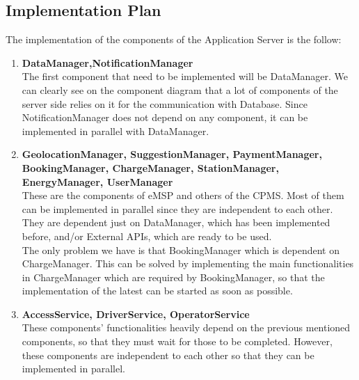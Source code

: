\documentclass[../main.tex]{subfiles}
\begin{document}
\subsection{Implementation Plan}
The implementation of the components of the Application Server is the follow: 
\begin{enumerate}
    \item \textbf{DataManager,NotificationManager} \\
    The first component that need to be implemented will be DataManager. We can clearly see on the component diagram that a lot of components of the server side relies on it for the communication with Database. Since NotificationManager does not depend on any component, it can be implemented in parallel with DataManager.
    
    \item \textbf{GeolocationManager, SuggestionManager, PaymentManager, BookingManager, ChargeManager, StationManager, EnergyManager, UserManager}\\
    These are the components of eMSP and others of the CPMS. Most of them can be implemented in parallel since they are independent to each other. They are dependent just on DataManager, which has been implemented before, and/or External APIs, which are ready to be used. \\
    The only problem we have is that BookingManager which is dependent on ChargeManager. This can be solved by implementing the main functionalities in ChargeManager which are required by BookingManager, so that the implementation of the latest can be started as soon as possible.

    \item \textbf{AccessService, DriverService, OperatorService}\\
    These components' functionalities heavily depend on the previous mentioned components, so that they must wait for those to be completed. However, these components are independent to each other so that they can be implemented in parallel.
\end{enumerate}
\end{document}
